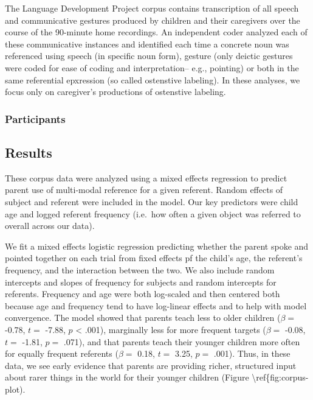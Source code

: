 \documentclass[english,,man,floatsintext]{apa6}
\begin{document}
The Language Development Project corpus contains transcription of all speech and communicative gestures produced by children and their caregivers over the course of the 90-minute home recordings. An independent coder analyzed each of these communicative instances and identified each time a concrete noun was referenced using speech (in specific noun form), gesture (only deictic gestures were coded for ease of coding and interpretation-- e.g., pointing) or both in the same referential epxression (so called ostenstive labeling). In these analyses, we focus only on caregiver's productions of ostenstive labeling.

\hypertarget{participants}{%
\subsubsection{Participants}\label{participants}}

\hypertarget{results}{%
\subsection{Results}\label{results}}

These corpus data were analyzed using a mixed effects regression to predict parent use of multi-modal reference for a given referent. Random effects of subject and referent were included in the model. Our key predictors were child age and logged referent frequency (i.e.~how often a given object was referred to overall across our data).

We fit a mixed effects logistic regression predicting whether the parent spoke and pointed together on each trial from fixed effects pf the child's age, the referent's frequency, and the interaction between the two. We also include random intercepts and slopes of frequency for subjects and random intercepts for referents. Frequency and age were both log-scaled and then centered both because age and frequency tend to have log-linear effects and to help with model convergence. The model showed that parents teach less to older children (\(\beta =\) -0.78, \(t =\) -7.88, \(p\) \textless{} .001), marginally less for more frequent targets (\(\beta =\) -0.08, \(t =\) -1.81, \(p =\) .071), and that parents teach their younger children more often for equally frequent referents (\(\beta =\) 0.18, \(t =\) 3.25, \(p =\) .001). Thus, in these data, we see early evidence that parents are providing richer, structured input about rarer things in the world for their younger children (Figure \textbackslash{}ref\{fig:corpus-plot).
\end{document}
